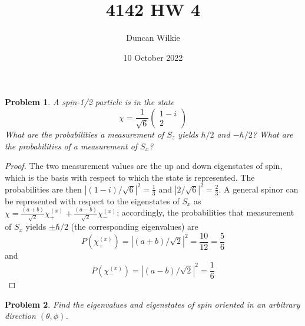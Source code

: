 \documentclass{article}
\title{4142 HW 4}
\author{Duncan Wilkie}
\date{10 October 2022}
\newtheorem{plm}{Problem}
\begin{document}
\maketitle

\begin{plm}
  A spin-1/2 particle is in the state
  \[
    \chi = \frac{1}{\sqrt{6}}
    \begin{pmatrix}
      1 - i \\
      2
    \end{pmatrix}
  \]
  What are the probabilities a measurement of $S_{z}$ yields $\hbar / 2$ and $-\hbar / 2$?
  What are the probabilities of a measurement of $S_{x}$?
\end{plm}

\begin{proof}
  The two measurement values are the up and down eigenstates of spin, which is the basis with respect to which the state is represented.
  The probabilities are then $|(1 - i)/\sqrt{6}|^{2} = \frac{1}{3}$ and $|2/\sqrt{6}|^{2} = \frac{2}{3}$.
  A general spinor can be represented with respect to the eigenstates of $S_{x}$ as $\chi = \frac{(a+b)}{\sqrt{2}}\chi_{+}^{(x)}
  + \frac{(a-b)}{\sqrt{2}}\chi_{-}^{(x)}$; accordingly, the probabilities that measurement of $S_{x}$ yields $\pm \hbar/2$ (the corresponding eigenvalues) are
  \[
    P(\chi_{+}^{(x)}) = |(a + b)/\sqrt{2}|^{2} = \frac{10}{12} = \frac{5}{6}
  \]
  and
  \[
    P(\chi_{-}^{(x)}) = |(a - b)/\sqrt{2}|^{2} = \frac{1}{6}
  \]
\end{proof}

\begin{plm}
  Find the eigenvalues and eigenstates of spin oriented in an arbitrary direction $(\theta, \phi)$.
\end{plm}
\end{document}
